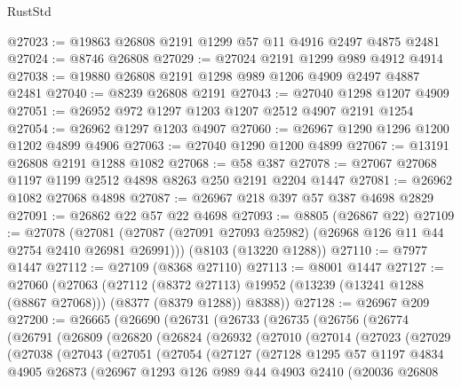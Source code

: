 \begin{lexlean}{RustStd}
\begin{coremodule}
@27023 := @19863 @26808 @2191 @1299 @57 @11 @4916 @2497 @4875 @2481
@27024 := @8746 @26808
@27029 := @27024 @2191 @1299 @989 @4912 @4914
@27038 := @19880 @26808 @2191 @1298 @989 @1206 @4909 @2497 @4887 @2481
@27040 := @8239 @26808 @2191
@27043 := @27040 @1298 @1207 @4909
@27051 := @26952 @972 @1297 @1203 @1207 @2512 @4907 @2191 @1254
@27054 := @26962 @1297 @1203 @4907
@27060 := @26967 @1290 @1296 @1200 @1202 @4899 @4906
@27063 := @27040 @1290 @1200 @4899
@27067 := @13191 @26808 @2191 @1288 @1082
@27068 := @58 @387
@27078 := @27067 @27068 @1197 @1199 @2512 @4898 @8263 @250 @2191 @2204 @1447
@27081 := @26962 @1082 @27068 @4898
@27087 := @26967 @218 @397 @57 @387 @4698 @2829
@27091 := @26862 @22 @57 @22 @4698
@27093 := @8805 (@26867 @22)
@27109 := @27078
    (@27081 (@27087 (@27091 @27093 @25982) (@26968 @126 @11 @44 @2754 @2410 @26981 @26991)))
    (@8103 (@13220 @1288))
@27110 := @7977 @1447
@27112 := @27109 (@8368 @27110)
@27113 := @8001 @1447
@27127 := @27060
    (@27063
      (@27112
        (@8372 @27113)
        @19952
        (@13239 (@13241 @1288 (@8867 @27068)))
        (@8377 (@8379 @1288))
        @8388))
@27128 := @26967 @209
@27200 := @26665
    (@26690
      (@26731
        (@26733
          (@26735
            (@26756
              (@26774
                (@26791
                  (@26809
                    (@26820
                      (@26824
                        (@26932
                          (@27010
                            (@27014
                              (@27023
                                (@27029
                                  (@27038
                                    (@27043
                                      (@27051
                                        (@27054
                                          (@27127
                                            (@27128
                                              @1295
                                              @57
                                              @1197
                                              @4834
                                              @4905
                                              @26873
                                              (@26967
                                                @1293
                                                @126
                                                @989
                                                @44
                                                @4903
                                                @2410
                                                (@20036
                                                  @26808

\end{coremodule}
\end{lexlean}
